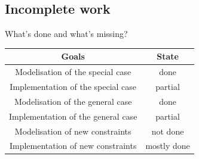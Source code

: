 \documentclass{beamer}
\begin{document}
\subsection{Incomplete work}
\begin{frame}{What's done and what's missing?}
\begin{center}
\begin{scriptsize}
\begin{tabular}{c|c}
	\textbf{Goals} & \textbf{State}\\
	\hline
	\hline
	Modelisation of the special case & done \\
	\hline
	Implementation of the special case & partial \\ %
	\hline
	Modelisation of the general case & done \\
	\hline
	Implementation of the general case & partial \\ %
	\hline
	Modelisation of new constraints & not done \\ %
	\hline
	Implementation of new constraints & mostly done \\ %
	\hline
\end{tabular}
\end{scriptsize}
\end{center}
\end{frame}
\end{document}
